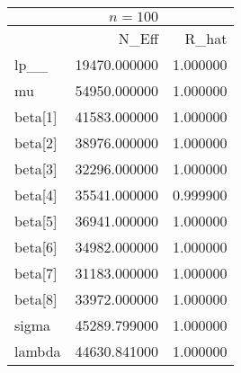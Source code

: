 \begin{tabular}{lrr}
& $ n = 100 $ & \\
\toprule
 & N\_Eff & R\_hat \\
\midrule
lp\_\_ & 19470.000000 & 1.000000 \\
mu & 54950.000000 & 1.000000 \\
beta[1] & 41583.000000 & 1.000000 \\
beta[2] & 38976.000000 & 1.000000 \\
beta[3] & 32296.000000 & 1.000000 \\
beta[4] & 35541.000000 & 0.999900 \\
beta[5] & 36941.000000 & 1.000000 \\
beta[6] & 34982.000000 & 1.000000 \\
beta[7] & 31183.000000 & 1.000000 \\
beta[8] & 33972.000000 & 1.000000 \\
sigma & 45289.799000 & 1.000000 \\
lambda & 44630.841000 & 1.000000 \\
\bottomrule
\end{tabular}
